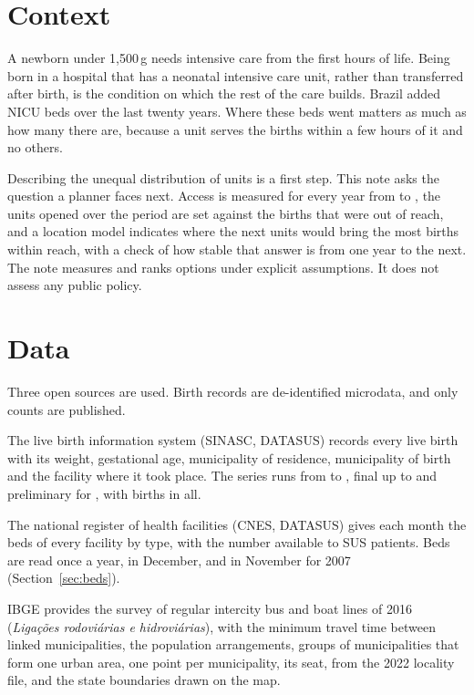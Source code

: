 \documentclass[11pt,a4paper]{article}
\begin{document}
\section{Context}
A newborn under 1,500\,g needs intensive care from the first hours of life.
Being born in a hospital that has a neonatal intensive care unit, rather than
transferred after birth, is the condition on which the rest of the care builds.
Brazil added NICU beds over the last twenty years. Where these beds went matters
as much as how many there are, because a unit serves the births within a few
hours of it and no others.

Describing the unequal distribution of units is a first step. This note asks the
question a planner faces next. Access is measured for every year from
\firstYear{} to \lastYear, the units opened over the period are set against the
births that were out of reach, and a location model indicates where the next
units would bring the most births within reach, with a check of how stable that
answer is from one year to the next. The note measures and ranks options under
explicit assumptions. It does not assess any public policy.

\section{Data}
Three open sources are used. Birth records are de-identified microdata, and only
counts are published.

The live birth information system (SINASC, DATASUS) records every live birth with
its weight, gestational age, municipality of residence, municipality of birth and
the facility where it took place. The series runs from \firstYear{} to
\lastYear, final up to \lastFinalYear{} and preliminary for \lastYear, with
\birthsTotal{} births in all.

The national register of health facilities (CNES, DATASUS) gives each month the
beds of every facility by type, with the number available to SUS patients. Beds
are read once a year, in December, and in November for 2007 (Section~\ref{sec:beds}).

IBGE provides the survey of regular intercity bus and boat lines of 2016
(\textit{Ligações rodoviárias e hidroviárias}), with the minimum travel time
between linked municipalities, the population arrangements, groups of
municipalities that form one urban area, one point per municipality, its seat,
from the 2022 locality file, and the state boundaries drawn on the map.
\end{document}
